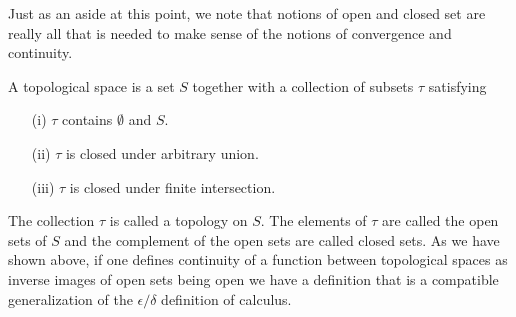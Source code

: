 Just as an aside at this point, we note that notions of open and
closed set are really all that is needed to make sense of the notions
of convergence and continuity.
\begin{defn}A topological space is a set $S$ together with a
  collection of subsets $\tau$ satisfying
\begin{itemize}
\item[(i)]$\tau$ contains $\emptyset$ and $S$.
\item[(ii)]$\tau$ is closed under arbitrary union.
\item[(iii)]$\tau$ is closed under finite intersection.
\end{itemize}
The collection $\tau$ is called a topology on $S$.  The elements of
$\tau$ are called the open sets of $S$ and the complement of the open
sets are called closed sets.  As we have shown above, if one defines
continuity of a function between topological spaces as inverse images
of open sets being open we have a definition that is a compatible
generalization of the $\epsilon/\delta$ definition of calculus.
\end{defn}

